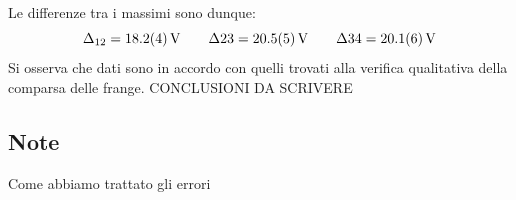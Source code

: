 	Le differenze tra i massimi sono dunque:
	$$\Delta_{12}=\SI{18.2\pm 0.4}{\volt} \qquad \Delta{23}=\SI{20.5 \pm 0.5}{\volt} \qquad \Delta{34}=\SI{20.1 \pm 0.6}{\volt}$$
	Si osserva che dati sono in accordo con quelli trovati alla 
	verifica qualitativa della comparsa delle frange.
	CONCLUSIONI DA SCRIVERE
	
\subsection{Note}
Come abbiamo trattato gli errori
